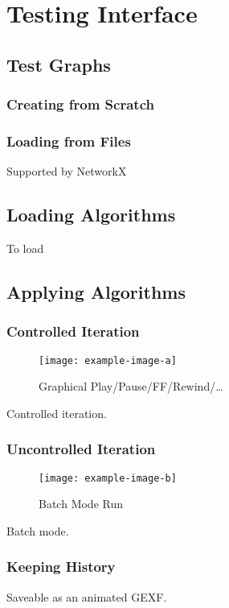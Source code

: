 \section{Testing Interface}
\label{sec:interface-testing}

\subsection{Test Graphs}
\subsubsection{Creating from Scratch}
\subsubsection{Loading from Files}
\label{sec:interface-testing:import}
Supported by NetworkX~\autocite{hagberg:networkx}

\subsection{Loading Algorithms} %
To load
\subsection{Applying Algorithms}
\subsubsection{Controlled Iteration}
\begin{figure}
  \centering
  \texttt{[image: example-image-a]}
  \caption{Graphical Play\slash Pause\slash FF\slash Rewind\slash\dots}
  \label{fig:iface:alg-test-controlled}
\end{figure}
\begin{draftvspace}{2in}
  Controlled iteration.
\end{draftvspace}
\subsubsection{Uncontrolled Iteration}
\begin{figure}
  \centering
  \texttt{[image: example-image-b]}
  \caption{Batch Mode Run}
  \label{fig:iface:alg-test-batch}
\end{figure}
\begin{draftvspace}{2in}
  Batch mode.
\end{draftvspace}
\subsubsection{Keeping History}
\begin{draftvspace}{1in}
  Saveable as an animated GEXF.
\end{draftvspace}

